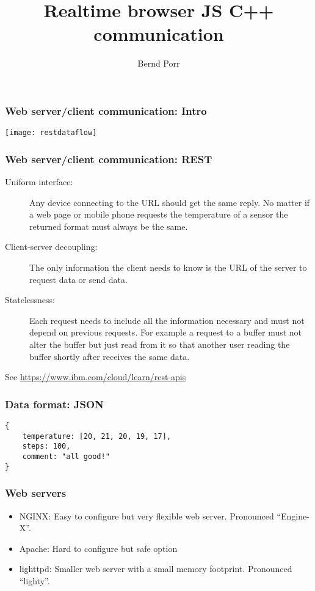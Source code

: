 \documentclass[xcolor=dvipsnames]{beamer}
\date{}
\title{Realtime browser JS C++ communication}
\author{Bernd Porr}
\begin{document}
\begin{frame}
\titlepage
\end{frame}







\begin{frame}[fragile]
  \frametitle{Web server/client communication: Intro}
\texttt{[image: restdataflow]}

\end{frame}



\begin{frame}[fragile]
  \frametitle{Web server/client communication: REST}
\begin{description}
\item[Uniform interface:] Any device connecting to the URL should
  get the same reply. No matter if a web page or mobile phone
  requests the temperature of a sensor the returned format must always be the same.
\item[Client-server decoupling:] The only information
  the client needs to know is the URL of the server to request data or send data.
\item[Statelessness:] Each request needs to include all the
  information necessary and must not depend on previous requests. For
  example a request to a buffer must not alter the
  buffer but just read from it so that another user reading the buffer
  shortly after receives the same data.
\end{description}
See \url{https://www.ibm.com/cloud/learn/rest-apis}
\end{frame}



\begin{frame}[fragile]
  \frametitle{Data format: JSON}

\begin{verbatim}
{
    temperature: [20, 21, 20, 19, 17],
    steps: 100,
    comment: "all good!"
}
\end{verbatim}
\end{frame}

\begin{frame}[fragile]
  \frametitle{Web servers}
\begin{itemize}
  \item NGINX: Easy to configure but very flexible web server. Pronounced ``Engine-X''.
  \item Apache: Hard to configure but safe option
  \item lighttpd: Smaller web server with a small memory footprint. Pronounced ``lighty''.
\end{itemize}
\end{frame}
\end{document}
